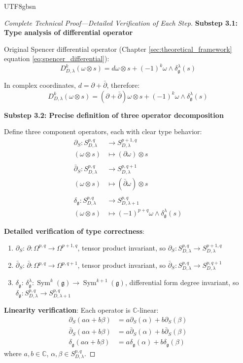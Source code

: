 \documentclass[a4paper,12pt]{extarticle}
\theoremstyle{definition}
\begin{document}
\begin{CJK}{UTF8}{gbsn}
\begin{proof}[Complete Technical Proof—Detailed Verification of Each Step]
\textbf{Substep 3.1: Type analysis of differential operator}

Original Spencer differential operator (Chapter \ref{sec:theoretical_framework} equation \eqref{eq:spencer_differential}):
$$D^k_{D,\lambda}(\omega \otimes s) = d\omega \otimes s + (-1)^k \omega \wedge \delta^\lambda_\mathfrak{g}(s)$$

In complex coordinates, $d = \partial + \bar{\partial}$, therefore:
$$D^k_{D,\lambda}(\omega \otimes s) = (\partial + \bar{\partial})\omega \otimes s + (-1)^k \omega \wedge \delta^\lambda_\mathfrak{g}(s)$$

\textbf{Substep 3.2: Precise definition of three operator decomposition}

Define three component operators, each with clear type behavior:
\begin{align}
\partial_S: S^{p,q}_{D,\lambda} &\to S^{p+1,q}_{D,\lambda} \\
(\omega \otimes s) &\mapsto (\partial\omega) \otimes s \\
\\
\bar{\partial}_S: S^{p,q}_{D,\lambda} &\to S^{p,q+1}_{D,\lambda} \\
(\omega \otimes s) &\mapsto (\bar{\partial}\omega) \otimes s \\
\\
\delta_{\mathfrak{g}}: S^{p,q}_{D,\lambda} &\to S^{p,q}_{D,\lambda+1} \\
(\omega \otimes s) &\mapsto (-1)^{p+q} \omega \wedge \delta^\lambda_\mathfrak{g}(s)
\end{align}

\textbf{Detailed verification of type correctness}:
\begin{enumerate}
    \item $\partial_S$: $\partial: \Omega^{p,q} \to \Omega^{p+1,q}$, tensor product invariant, so $\partial_S: S^{p,q}_{D,\lambda} \to S^{p+1,q}_{D,\lambda}$
    \item $\bar{\partial}_S$: $\bar{\partial}: \Omega^{p,q} \to \Omega^{p,q+1}$, tensor product invariant, so $\bar{\partial}_S: S^{p,q}_{D,\lambda} \to S^{p,q+1}_{D,\lambda}$
    \item $\delta_{\mathfrak{g}}$: $\delta^\lambda_\mathfrak{g}: \operatorname{Sym}^k(\mathfrak{g}) \to \operatorname{Sym}^{k+1}(\mathfrak{g})$, differential form degree invariant, so $\delta_{\mathfrak{g}}: S^{p,q}_{D,\lambda} \to S^{p,q}_{D,\lambda+1}$
\end{enumerate}

\textbf{Linearity verification}: Each operator is $\mathbb{C}$-linear:
\begin{align}
\partial_S(a\alpha + b\beta) &= a\partial_S(\alpha) + b\partial_S(\beta) \\
\bar{\partial}_S(a\alpha + b\beta) &= a\bar{\partial}_S(\alpha) + b\bar{\partial}_S(\beta) \\
\delta_{\mathfrak{g}}(a\alpha + b\beta) &= a\delta_{\mathfrak{g}}(\alpha) + b\delta_{\mathfrak{g}}(\beta)
\end{align}
where $a, b \in \mathbb{C}$, $\alpha, \beta \in S^{p,q}_{D,\lambda}$.


\end{proof}
\end{CJK}
\end{document}
